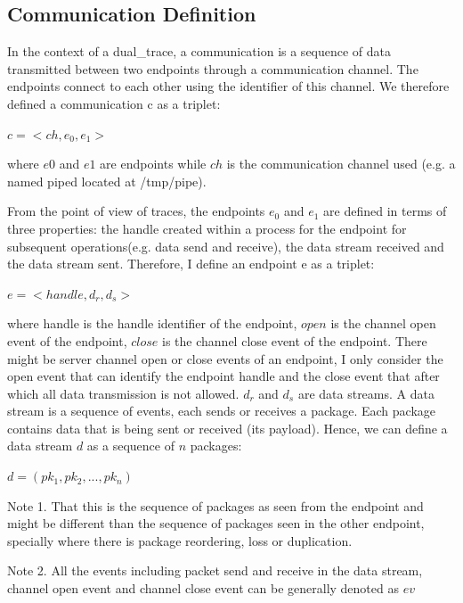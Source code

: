 \subsection{Communication Definition}
In the context of a dual\_trace, a communication is a sequence of data transmitted between two endpoints through a communication channel. The endpoints connect to each other using the identifier of this channel. We therefore defined a communication c as a triplet:

$c =<ch, e_0, e_1>$

where $e0$ and $e1$ are endpoints while $ch$ is the communication channel used (e.g. a named piped located at /tmp/pipe).

From the point of view of traces, the endpoints $e_0$ and $e_1$ are defined in terms of three properties: the handle created within a process for the endpoint for subsequent operations(e.g. data send and receive), the data stream received and the data stream sent. Therefore, I define an endpoint e as a triplet:

$ e =<handle,  d_r, d_s>$

where handle is the handle identifier of the endpoint, $open$ is the channel open event of the endpoint, $close$ is the channel close event of the endpoint. There might be server channel open or close events of an endpoint, I only consider the open event that can identify the endpoint handle and the close event that after which all data transmission is not allowed. $d_r$ and $d_s$ are data streams. A data stream is a sequence of events, each sends or receives a package. Each package contains data that is being sent or received (its payload). Hence, we can define a data stream $d$ as a sequence of $n$ packages:

$ d = (pk_1, pk_2, ..., pk_n)$ 

Note 1. That this is the sequence of packages as seen from the endpoint and might be different than the sequence of packages seen in the other endpoint, specially where there is package reordering, loss or duplication.

Note 2. All the events including packet send and receive in the data stream, channel open event and channel close event can be generally denoted as $ev$

